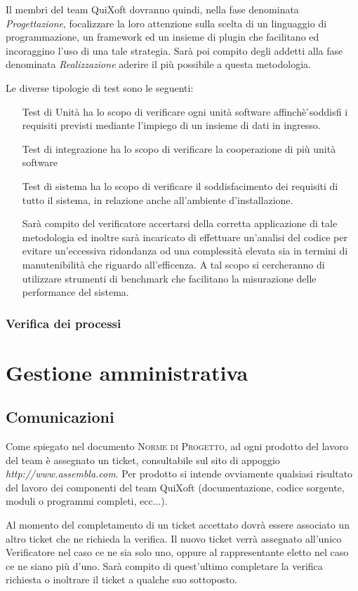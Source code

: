\documentclass[11pt,a4paper]{article}
\begin{document}
Il membri del team QuiXoft dovranno quindi, nella fase denominata \textit{Progettazione}, focalizzare la loro attenzione sulla scelta di un linguaggio di programmazione, un framework ed un insieme di plugin che facilitano ed incoraggino l'uso di una tale strategia. Sarà poi compito degli addetti alla fase denominata \textit{Realizzazione} aderire il più possibile a questa metodologia.

Le diverse tipologie di test sono le seguenti:
\begin{itemize}
 \item[Test di Unità] ha lo scopo di verificare ogni unità software affinchè ́soddisfi i requisiti previsti mediante l’impiego di un insieme di dati in ingresso.
 \item[Test di integrazione] ha lo scopo di verificare la cooperazione di più unità software
 \item[Test di sistema] ha lo scopo di verificare il soddisfacimento dei requisiti di tutto il sistema, in relazione anche all'ambiente d'installazione.

Sarà compito del verificatore accertarsi della corretta applicazione di tale metodologia ed inoltre sarà incaricato di effettuare un'analisi del codice per evitare un'eccessiva ridondanza od una complessità elevata sia in termini di manutenibilità che riguardo all'efficenza. A tal scopo si cercheranno di utilizzare strumenti di benchmark che facilitano la misurazione delle performance del sistema.
\end{itemize}
\subsubsection{Verifica dei processi}
\section{Gestione amministrativa}
\subsection{Comunicazioni}
Come spiegato nel documento \textsc{Norme di Progetto}, ad ogni prodotto del lavoro del team è assegnato un ticket, consultabile sul sito di appoggio \textit{http://www.assembla.com}. Per prodotto si intende ovviamente qualsiasi risultato del lavoro dei componenti del team QuiXoft (documentazione, codice sorgente, moduli o programmi completi, ecc...).

Al momento del completamento di un ticket accettato dovrà essere associato un altro ticket che ne richieda la verifica. Il nuovo ticket verrà assegnato all'unico Verificatore nel caso ce ne sia solo uno, oppure al rappresentante eletto nel caso ce ne siano più d'uno. Sarà compito di quest'ultimo completare la verifica richiesta o inoltrare il ticket a qualche suo sottoposto.
\end{document}
